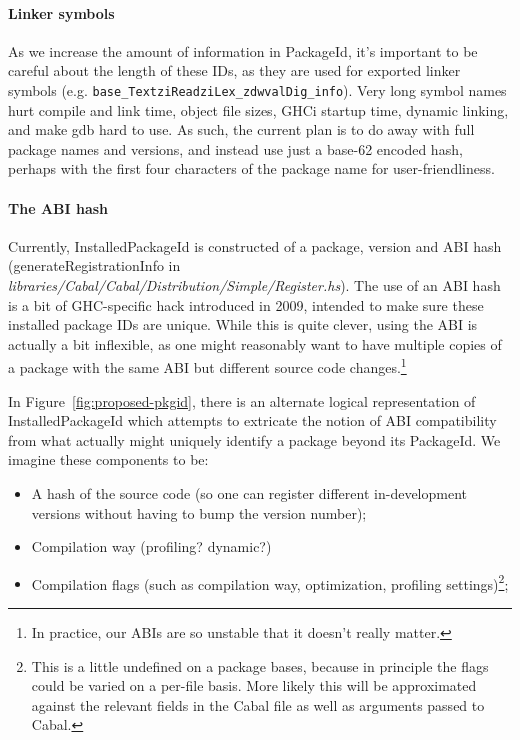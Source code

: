 \documentclass{article}
\newcommand{\ghcfile}[1]{\textsl{#1}}
\begin{document}
\paragraph{Linker symbols} As we increase the amount of information in
PackageId, it's important to be careful about the length of these IDs,
as they are used for exported linker symbols (e.g.
\verb|base_TextziReadziLex_zdwvalDig_info|).  Very long symbol names
hurt compile and link time, object file sizes, GHCi startup time,
dynamic linking, and make gdb hard to use.  As such, the current plan is
to do away with full package names and versions, and instead use just a
base-62 encoded hash, perhaps with the first four characters of the package
name for user-friendliness.

\paragraph{The ABI hash} Currently, InstalledPackageId
is constructed of a package, version and ABI hash
(generateRegistrationInfo in
\ghcfile{libraries/Cabal/Cabal/Distribution/Simple/Register.hs}).  The
use of an ABI hash is a bit of GHC-specific hack introduced in 2009,
intended to make sure these installed package IDs are unique.  While
this is quite clever, using the ABI is actually a bit inflexible, as one
might reasonably want to have multiple copies of a package with the same
ABI but different source code changes.\footnote{In practice, our ABIs
are so unstable that it doesn't really matter.}

In Figure~\ref{fig:proposed-pkgid}, there is an alternate logical
representation of InstalledPackageId which attempts to extricate the
notion of ABI compatibility from what actually might uniquely identify a
package beyond its PackageId.  We imagine these components to be:

\begin{itemize}
    \item A hash of the source code (so one can register different
        in-development versions without having to bump the version
        number);
    \item Compilation way (profiling? dynamic?)
    \item Compilation flags (such as compilation way, optimization,
        profiling settings)\footnote{This is a little undefined on a package bases, because in principle the flags could be varied on a per-file basis. More likely this will be approximated against the relevant fields in the Cabal file as well as arguments passed to Cabal.};
\end{itemize}
\end{document}
